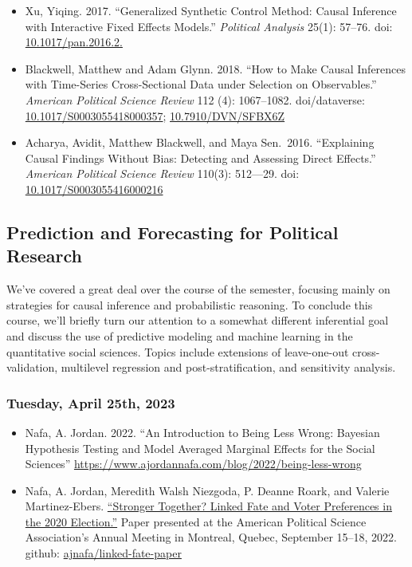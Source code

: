 \documentclass[12pt,]{article}
\begin{document}
\begin{itemize}
\item
  Xu, Yiqing. 2017. ``Generalized Synthetic Control Method: Causal
  Inference with Interactive Fixed Effects Models.'' \emph{Political
  Analysis} 25(1): 57--76. doi:
  \href{https://doi.org/10.1017/pan.2016.2}{10.1017/pan.2016.2.}
\item
  Blackwell, Matthew and Adam Glynn. 2018. ``How to Make Causal
  Inferences with Time-Series Cross-Sectional Data under Selection on
  Observables.'' \emph{American Political Science Review} 112 (4):
  1067--1082. doi/dataverse:
  \href{https://doi.org/10.1017/S0003055418000357}{10.1017/S0003055418000357};
  \href{https://doi.org/10.7910/DVN/SFBX6Z}{10.7910/DVN/SFBX6Z}
\item
  Acharya, Avidit, Matthew Blackwell, and Maya Sen.~2016. ``Explaining
  Causal Findings Without Bias: Detecting and Assessing Direct
  Effects.'' \emph{American Political Science Review} 110(3): 512---29.
  doi:
  \href{https://doi.org/10.1017/S0003055416000216}{10.1017/S0003055416000216}
\end{itemize}

\hypertarget{prediction-and-forecasting-for-political-research}{%
\subsection{Prediction and Forecasting for Political
Research}\label{prediction-and-forecasting-for-political-research}}

\noindent We've covered a great deal over the course of the semester,
focusing mainly on strategies for causal inference and probabilistic
reasoning. To conclude this course, we'll briefly turn our attention to
a somewhat different inferential goal and discuss the use of predictive
modeling and machine learning in the quantitative social sciences.
Topics include extensions of leave-one-out cross-validation, multilevel
regression and post-stratification, and sensitivity analysis.

\hypertarget{tuesday-april-25th-2023}{%
\subsubsection{Tuesday, April 25th,
2023}\label{tuesday-april-25th-2023}}

\begin{itemize}
\item
  Nafa, A. Jordan. 2022. ``An Introduction to Being Less Wrong: Bayesian
  Hypothesis Testing and Model Averaged Marginal Effects for the Social
  Sciences''
  \url{https://www.ajordannafa.com/blog/2022/being-less-wrong}
\item
  Nafa, A. Jordan, Meredith Walsh Niezgoda, P. Deanne Roark, and Valerie
  Martinez-Ebers.
  \href{https://github.com/ajnafa/linked-fate-paper/raw/main/manuscript/latex/Stronger-Together-Draft-TeX.pdf}{``Stronger
  Together? Linked Fate and Voter Preferences in the 2020 Election.''}
  Paper presented at the American Political Science Association's Annual
  Meeting in Montreal, Quebec, September 15--18, 2022. github:
  \href{https://github.com/ajnafa/linked-fate-paper}{ajnafa/linked-fate-paper}
\end{itemize}
\end{document}
